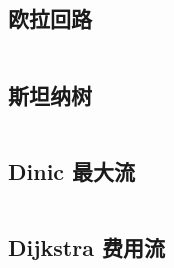 \documentclass[titlepage, a4paper]{article}
\newcommand\nothing{}
\renewcommand{\checkmark}[0]{\nothing}
\begin{document}
\begin{multicols}{2}
\begin{spacing}{0.6}
				\subsection{欧拉回路\checkmark}
				\inputminted{cpp}{src/TreeandGraph/欧拉回路.cpp}
				\subsection{斯坦纳树}
				\inputminted{cpp}{src/TreeandGraph/斯坦纳树.cpp}
				\subsection{Dinic 最大流}
				
				\inputminted{cpp}{src/TreeandGraph/Dinic.cpp}
				\subsection{Dijkstra 费用流\checkmark}
				\inputminted{cpp}{src/TreeandGraph/MCMF_dij.cpp}

\end{spacing}
\end{multicols}
\end{document}
